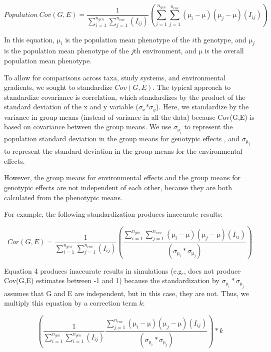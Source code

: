 \documentclass[11pt, oneside]{amsart}
\begin{document}
\begin{equation}
Population\:Cov(G,E) =  \frac{1}{ \sum_{i=1}^{n_{gen}}  \sum_{j=1}^{n_{env}}(I_{ij})} (\sum_{i=1}^{n_{gen}}  \sum_{j=1}^{n_{env}}(\si\micro_{i} - \si\micro)(\si\micro_{j} - \si\micro)(I_{ij}))
\end{equation}


In this equation, $\si\micro_{i}$ is the population mean phenotype of the $i$th genotype, and $\si\micro_{j}$ is the population mean phenotype of the $j$th environment, and $\si\micro$ is the overall population mean phenotype.

To allow for comparisons across taxa, study systems, and environmental gradients, we sought to standardize $Cov(G,E)$. The typical approach to standardize covariance is correlation, which standardizes by the product of the standard deviation of the x and y variable ($\sigma_{x}$*$\sigma_{y}$). Here, we standardize by the variance in group means (instead of variance in all the data) because Cov(G,E) is based on covariance between the group means.
We use $\sigma_{\si\micro_{i}}$ to represent the population standard deviation in the group means for genotypic effects , and $\sigma_{\si\micro_{j}}$ to represent the standard deviation in the group means for the environmental effects.

However, the group means for environmental effects and the group means for genotypic effects are not independent of each other, because they are both calculated from the phenotypic means.

For example, the following standardization produces inaccurate results: 

\begin{equation}
Cor(G,E) = \frac{1}{ \sum_{i=1}^{n_{gen}}  \sum_{j=1}^{n_{env}}(I_{ij})} (\frac { \sum_{i=1}^{n_{gen}}  \sum_{j=1}^{n_{env}}(\si\micro_{i} - \si\micro)(\si\micro_{j} - \si\micro)(I_{ij})}{(\sigma_{\si\micro_{i}}*\sigma_{\si\micro_{j}})})
\end{equation}

Equation 4 produces inaccurate results in simulations (e.g., does not produce Cov(G,E) estimates between -1 and 1) because the standardization by $\sigma_{\si\micro_{i}}*\sigma_{\si\micro_{j}}$ assumes that G and E are independent, but in this case, they are not. Thus, we multiply this equation by a correction term $k$:

\begin{equation}
( \frac{1}{ \sum_{i=1}^{n_{gen}}  \sum_{i=1}^{n_{gen}}(I_{ij})} \frac {\sum_{j=1}^{n_{env}}(\si\micro_{i} - \si\micro)(\si\micro_{j} - \si\micro)(I_{ij})}{(\sigma_{\si\micro_{i}}*\sigma_{\si\micro_{j}})})*k
\end{equation}
\end{document}
